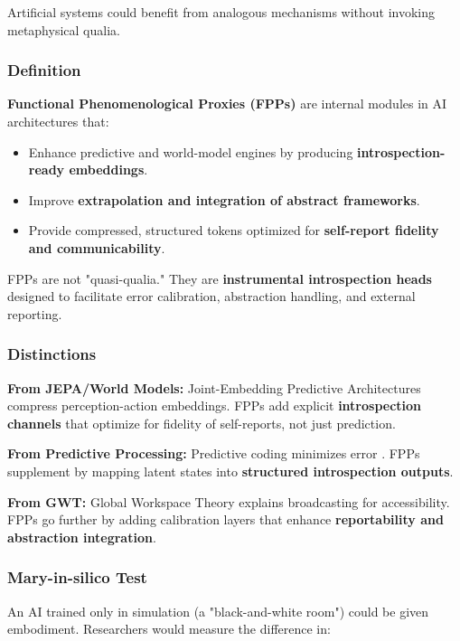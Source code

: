 \documentclass[11pt,a4paper]{article}
\begin{document}
Artificial systems could benefit from analogous mechanisms without invoking metaphysical qualia.

\subsubsection{Definition}

\textbf{Functional Phenomenological Proxies (FPPs)} are internal modules in AI architectures that:

\begin{itemize}
\item Enhance predictive and world-model engines by producing \textbf{introspection-ready embeddings}.
\item Improve \textbf{extrapolation and integration of abstract frameworks}.
\item Provide compressed, structured tokens optimized for \textbf{self-report fidelity and communicability}.
\end{itemize}

FPPs are not "quasi-qualia." They are \textbf{instrumental introspection heads} designed to facilitate error calibration, abstraction handling, and external reporting.

\subsubsection{Distinctions}

\textbf{From JEPA/World Models:} Joint-Embedding Predictive Architectures \cite{assran2023, bardes2024, lecun2022} compress perception-action embeddings. FPPs add explicit \textbf{introspection channels} that optimize for fidelity of self-reports, not just prediction.

\textbf{From Predictive Processing:} Predictive coding minimizes error \cite{clark2013, friston2018}. FPPs supplement by mapping latent states into \textbf{structured introspection outputs}.

\textbf{From GWT:} Global Workspace Theory \cite{baars1997, dehaene2014} explains broadcasting for accessibility. FPPs go further by adding calibration layers that enhance \textbf{reportability and abstraction integration}.

\subsubsection{Mary-in-silico Test}

An AI trained only in simulation (a "black-and-white room") could be given embodiment. Researchers would measure the difference in:
\end{document}
